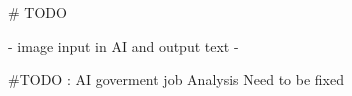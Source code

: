 # TODO

- image input in AI and output text
- 


#TODO : AI goverment job Analysis Need to be fixed

